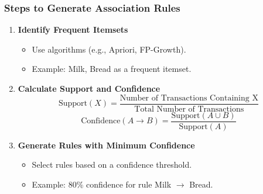 \documentclass{beamer}
\begin{document}
\begin{frame}[fragile]
    \frametitle{Steps to Generate Association Rules}
    \begin{enumerate}
        \item \textbf{Identify Frequent Itemsets}
            \begin{itemize}
                \item Use algorithms (e.g., Apriori, FP-Growth).
                \item Example: {Milk, Bread} as a frequent itemset.
            \end{itemize}
            
        \item \textbf{Calculate Support and Confidence}
            \begin{equation}
                \text{Support}(X) = \frac{\text{Number of Transactions Containing X}}{\text{Total Number of Transactions}}
            \end{equation}
            \begin{equation}
                \text{Confidence}(A \to B) = \frac{\text{Support}(A \cup B)}{\text{Support}(A)}
            \end{equation}
        
        \item \textbf{Generate Rules with Minimum Confidence}
            \begin{itemize}
                \item Select rules based on a confidence threshold.
                \item Example: 80\% confidence for rule {Milk} $\to$ {Bread}.
            \end{itemize}
    \end{enumerate}
\end{frame}
\end{document}
